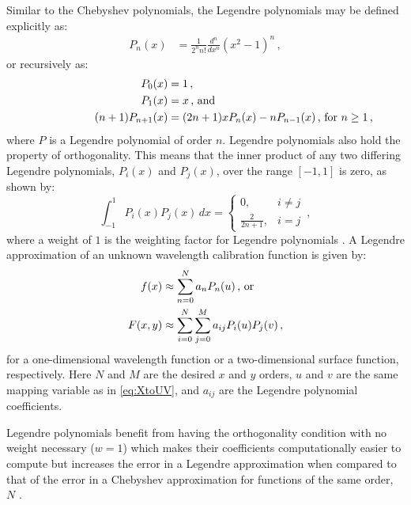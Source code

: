 Similar to the Chebyshev polynomials, the Legendre polynomials may be defined explicitly as:
\begin{align} \label{eq:legpolyexplicit}
    P_{n}(x) &= \frac{1}{2^{n} n!} \frac{d^{n}}{d x^{n}} (x^{2} - 1)^{n}\,,
\end{align}
or recursively as:
\begin{align}
    P_{0}(x) &= 1 \,,\notag\\
    P_{1}(x) &= x \rlap{\,,\ and} \label{eq:legpoly}\\
    (n+1)P_{n+1}(x) &= (2n+1)xP_n(x) - nP_{n-1}(x) \rlap{\,,\ for $n \geq 1$\,,}\notag
\end{align}
where $P$ is a Legendre polynomial of order $n$. Legendre polynomials also hold the property of orthogonality. This means that the inner product of any two differing Legendre polynomials, $P_{i}(x)$ and $P_{j}(x)$, over the range $[-1, 1]$ is zero, as shown by:
\begin{equation} \label{eq:legorth}
    \int_{-1}^{1} P_{i}(x) P_{j}(x) \,dx =
    \begin{cases}
        0,                 & i \neq j \\
        \frac{2}{2 n + 1}, & i = j
    \end{cases}\,,
\end{equation}
where a weight of $1$ is the weighting factor for Legendre polynomials \citep{numerical_recipes, leg}. A Legendre approximation of an unknown wavelength calibration function is given by:
\begin{align} \label{eq:legendre}
    f(x) &\approx \sum_{n = 0}^{N} a_{n} P_{n}(u) \rlap{\,,\ or}\\
    F(x, y) &\approx \sum_{i = 0}^{N} \sum_{j = 0}^{M} a_{ij} P_{i}(u) P_{j}(v)\,,\label{eq:Legendre2D}
\end{align}
for a one-dimensional wavelength function or a two-dimensional surface function, respectively. Here $N$ and $M$ are the desired $x$ and $y$ orders, $u$ and $v$ are the same mapping variable as in \autoref{eq:XtoUV}, and $a_{ij}$ are the Legendre polynomial coefficients.

Legendre polynomials benefit from having the orthogonality condition with no weight necessary ($w = 1$) which makes their coefficients computationally easier to compute but increases the error in a Legendre approximation when compared to that of the error in a Chebyshev approximation for functions of the same order, $N$ \citep{leg_cheb_relation}.

